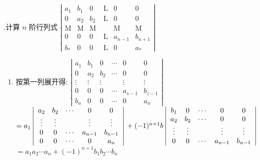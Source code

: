 \documentclass{article}
\begin{document}
\vspace{1ex}
{.}计算 $n$ 阶行列式 $\left|\begin{array}{cccccc}
        a_{1}      & b_{1}      & 0          & \mathrm{~L} & 0          & 0          \\
        0          & a_{2}      & b_{2}      & \mathrm{~L} & 0          & 0          \\
        \mathrm{M} & \mathrm{M} & \mathrm{M} &             & \mathrm{M} & \mathrm{M} \\
        0          & 0          & 0          & \mathrm{~L} & a_{n-1}    & b_{n+1}    \\
        b_{*}      & 0          & 0          & \mathrm{~L} & 0          & a_{*}
    \end{array}\right|$
\begin{enumerate}[\qquad 解： ]
    \item 按第一列展开得:
          $\left|\begin{array}{cccccc}
                  a_{1}  & b_{1}  & 0      & \cdots & 0       & 0       \\
                  0      & a_{2}  & b_{2}  & \cdots & 0       & 0       \\
                  \vdots & \vdots & \vdots &        & \vdots  & \vdots  \\
                  0      & 0      & 0      & \cdots & a_{s-1} & b_{z-1} \\
                  b_{n}  & 0      & 0      & \cdots & 0       & a_{n}
              \end{array}\right|$
          $=a_{1}\left|\begin{array}{ccccc}
                  a_{2}  & b_{2}  & \cdots & 0       & 0       \\
                  \vdots & \vdots &        & \vdots  & \vdots  \\
                  0      & 0      & \cdots & a_{n-1} & b_{n-1} \\
                  0      & 0      & \cdots & 0       & a_{n}
              \end{array}\right| \\
              +(-1)^{n+1}b \left|\begin{array}{ccccc}
                  b_{1}  & 0      & \cdots & 0       & 0       \\
                  a_{2}  & b_{2}  & \cdots & 0       & 0       \\
                  \vdots & \vdots &        & \vdots  & \vdots  \\
                  0      & 0      & \cdots & a_{n-1} & b_{n-1}
              \end{array}\right|$
          $=a_{1} a_{2} \cdots a_{n}+(-1)^{n+1} b_{1} b_{2} \cdots b_{n}$
\end{enumerate}
\end{document}
